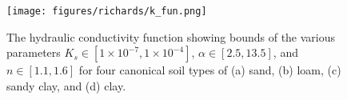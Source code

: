 \begin{figure}[ht]
\begin{center}
\texttt{[image: figures/richards/k\_fun.png]}
\end{center}
\caption{
    The hydraulic conductivity function showing bounds of the various parameters
    $K_s \in [1\times 10^{-7}, 1\times 10^{-4}]$, $\alpha \in [2.5, 13.5]$, and $n \in [1.1, 1.6]$
    for four canonical soil types of (a) sand, (b) loam, (c) sandy clay, and (d) clay.
}
\label{fig:richards-k_fun}
\end{figure}
